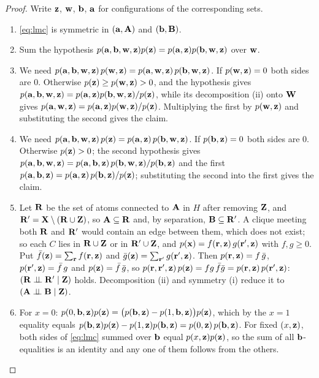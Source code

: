 \documentclass{article} %
\newcommand{\indep}{\perp\!\!\!\perp}
\begin{document}
\begin{proof}
Write $\mathbf{z}$, $\mathbf{w}$, $\mathbf{b}$, $\mathbf{a}$ for configurations of the corresponding sets.
\begin{enumerate}
  \item[(i)] \eqref{eq:lmc} is symmetric in $(\mathbf{a},\mathbf{A})$ and $(\mathbf{b},\mathbf{B})$.
  \item[(ii)] Sum the hypothesis $p(\mathbf{a},\mathbf{b},\mathbf{w},\mathbf{z})p(\mathbf{z})=p(\mathbf{a},\mathbf{z})p(\mathbf{b},\mathbf{w},\mathbf{z})$ over $\mathbf{w}$.
  \item[(iii)] We need $p(\mathbf{a},\mathbf{b},\mathbf{w},\mathbf{z})\,p(\mathbf{w},\mathbf{z})=p(\mathbf{a},\mathbf{w},\mathbf{z})\,p(\mathbf{b},\mathbf{w},\mathbf{z})$. If $p(\mathbf{w},\mathbf{z})=0$ both sides are $0$. Otherwise $p(\mathbf{z})\ge p(\mathbf{w},\mathbf{z})>0$, and the hypothesis gives $p(\mathbf{a},\mathbf{b},\mathbf{w},\mathbf{z})=p(\mathbf{a},\mathbf{z})p(\mathbf{b},\mathbf{w},\mathbf{z})/p(\mathbf{z})$, while its decomposition (ii) onto $\mathbf{W}$ gives $p(\mathbf{a},\mathbf{w},\mathbf{z})=p(\mathbf{a},\mathbf{z})p(\mathbf{w},\mathbf{z})/p(\mathbf{z})$. Multiplying the first by $p(\mathbf{w},\mathbf{z})$ and substituting the second gives the claim.
  \item[(iv)] We need $p(\mathbf{a},\mathbf{b},\mathbf{w},\mathbf{z})\,p(\mathbf{z})=p(\mathbf{a},\mathbf{z})\,p(\mathbf{b},\mathbf{w},\mathbf{z})$. If $p(\mathbf{b},\mathbf{z})=0$ both sides are $0$. Otherwise $p(\mathbf{z})>0$; the second hypothesis gives $p(\mathbf{a},\mathbf{b},\mathbf{w},\mathbf{z})=p(\mathbf{a},\mathbf{b},\mathbf{z})\,p(\mathbf{b},\mathbf{w},\mathbf{z})/p(\mathbf{b},\mathbf{z})$ and the first $p(\mathbf{a},\mathbf{b},\mathbf{z})=p(\mathbf{a},\mathbf{z})\,p(\mathbf{b},\mathbf{z})/p(\mathbf{z})$; substituting the second into the first gives the claim.
  \item[(v)] Let $\mathbf{R}$ be the set of atoms connected to $\mathbf{A}$ in $H$ after removing $\mathbf{Z}$, and $\mathbf{R}'=\mathbf{X}\setminus(\mathbf{R}\cup\mathbf{Z})$, so $\mathbf{A}\subseteq\mathbf{R}$ and, by separation, $\mathbf{B}\subseteq\mathbf{R}'$. A clique meeting both $\mathbf{R}$ and $\mathbf{R}'$ would contain an edge between them, which does not exist; so each $C$ lies in $\mathbf{R}\cup\mathbf{Z}$ or in $\mathbf{R}'\cup\mathbf{Z}$, and $p(\mathbf{x})=f(\mathbf{r},\mathbf{z})\,g(\mathbf{r}',\mathbf{z})$ with $f,g\ge0$. Put $\bar f(\mathbf{z})=\sum_{\mathbf{r}}f(\mathbf{r},\mathbf{z})$ and $\bar g(\mathbf{z})=\sum_{\mathbf{r}'}g(\mathbf{r}',\mathbf{z})$. Then $p(\mathbf{r},\mathbf{z})=f\,\bar g$, $p(\mathbf{r}',\mathbf{z})=\bar f\,g$ and $p(\mathbf{z})=\bar f\,\bar g$, so $p(\mathbf{r},\mathbf{r}',\mathbf{z})\,p(\mathbf{z})=fg\,\bar f\bar g=p(\mathbf{r},\mathbf{z})\,p(\mathbf{r}',\mathbf{z})$: $(\bR\indep\bR'\mid\bZ)$ holds. Decomposition (ii) and symmetry (i) reduce it to $(\bA\indep\bB\mid\bZ)$.
  \item[(vi)] For $x=0$: $p(0,\mathbf{b},\mathbf{z})p(\mathbf{z})=\bigl(p(\mathbf{b},\mathbf{z})-p(1,\mathbf{b},\mathbf{z})\bigr)p(\mathbf{z})$, which by the $x=1$ equality equals $p(\mathbf{b},\mathbf{z})p(\mathbf{z})-p(1,\mathbf{z})p(\mathbf{b},\mathbf{z})=p(0,\mathbf{z})\,p(\mathbf{b},\mathbf{z})$. For fixed $(x,\mathbf{z})$, both sides of \eqref{eq:lmc} summed over $\mathbf{b}$ equal $p(x,\mathbf{z})p(\mathbf{z})$, so the sum of all $\mathbf{b}$-equalities is an identity and any one of them follows from the others. \qedhere
\end{enumerate}
\end{proof}
\end{document}
